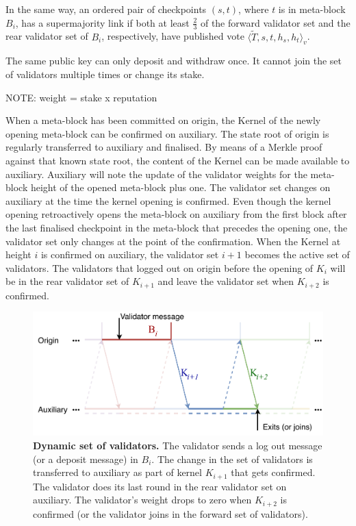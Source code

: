 \documentclass[12pt,a4paper]{article}
\begin{document}
 In the same way, an ordered pair of checkpoints $(s, t)$, where $t$ is in meta-block $B_i$, has a supermajority link if both at least $\frac{2}{3}$ of the forward validator set and the rear validator set of $B_i$, respectively, have published vote $\langle \tilde{T}, s, t, h_{s}, h_{t}\rangle_v$.

The same public key can only deposit and withdraw once.
It cannot join the set of validators multiple times or change its stake.

NOTE: weight = stake x reputation

When a meta-block has been committed on origin, the Kernel of the newly opening meta-block can be confirmed on auxiliary.
The state root of origin is regularly transferred to auxiliary and finalised.
By means of a Merkle proof against that known state root, the content of the Kernel can be made available to auxiliary.
Auxiliary will note the update of the validator weights for the meta-block height of the opened meta-block plus one.
The validator set changes on auxiliary at the time the kernel opening is confirmed.
Even though the kernel opening retroactively opens the meta-block on auxiliary from the first block after the last finalised checkpoint in the meta-block that precedes the opening one, the validator set only changes at the point of the confirmation.
When the Kernel at height $i$ is confirmed on auxiliary, the validator set $i+1$ becomes the active set of validators.
The validators that logged out on origin before the opening of $K_i$ will be in the rear validator set of $K_{i+1}$ and leave the validator set when $K_{i+2}$ is confirmed.

\begin{figure}[htb]
    \centering
	\includegraphics[width=\textwidth]{dynamic_validators}
	\caption{\textbf{Dynamic set of validators.}
		The validator sends a log out message (or a deposit message) in $B_i$.
		The change in the set of validators is transferred to auxiliary as part of kernel $K_{i+1}$ that gets confirmed.
		The validator does its last round in the rear validator set on auxiliary.
		The validator's weight drops to zero when $K_{i+2}$ is confirmed (or the validator joins in the forward set of validators).
	}
	\label{fig:dynamic_validators}
\end{figure}
\end{document}
